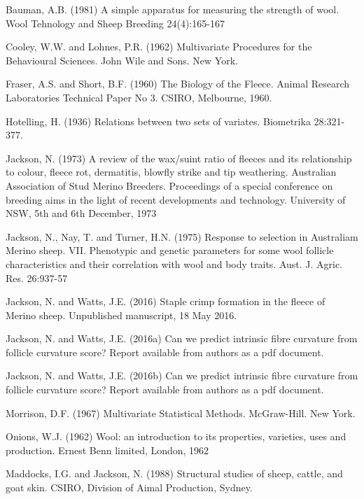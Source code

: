 \documentclass[titlepage]{article}  %
\begin{document}
\begin{thebibliography}{99}

Bauman, A.B. (1981) A simple apparatus for measuring the strength of wool.
    Wool Tehnology and Sheep Breeding 24(4):165-167

Cooley, W.W. and Lohnes, P.R. (1962) Multivariate Procedures for the Behavioural Sciences. John Wile and Sons. New York.


Fraser, A.S. and Short, B.F. (1960) The Biology of the Fleece. Animal Research Laboratories Technical Paper No 3. CSIRO, Melbourne, 1960.

Hotelling, H. (1936) Relations between two sets of variates. Biometrika 28:321-377.

Jackson, N. (1973) A review of the wax/suint ratio of fleeces and its relationship to colour, fleece rot, dermatitis, blowfly strike and tip weathering. Australian Association of Stud Merino Breeders. Proceedings of a special conference on breeding aims in the light of recent developments and technology. University of NSW, 5th and 6th December, 1973

Jackson, N., Nay, T. and Turner, H.N. (1975) Response to selection in Australiam Merino sheep. VII. Phenotypic and genetic parameters for some wool follicle characteristics and their correlation with wool and body traits. Aust. J. Agric. Res. 26:937-57

Jackson, N. and Watts, J.E. (2016) Staple crimp formation in the fleece of Merino sheep. Unpublished manuscript, 18 May 2016.

Jackson, N. and Watts, J.E. (2016a) Can we predict intrinsic fibre curvature from follicle curvature score? Report available from authors as a pdf document.

Jackson, N. and Watts, J.E. (2016b) Can we predict intrinsic fibre curvature from follicle curvature score? Report available from authors as a pdf document.

Morrison, D.F. (1967) Multivariate Statistical Methods. McGraw-Hill. New York.

Onions, W.J. (1962) Wool: an introduction to its properties, varieties, uses
     and production. Ernest Benn limited, London, 1962

Maddocks, I.G. and Jackson, N. (1988) Structural studies of sheep, cattle, and goat skin. CSIRO, Division of Aimal Production, Sydney.


\end{thebibliography}
\end{document}
